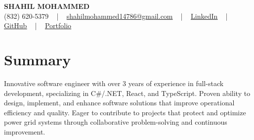 \documentclass[letterpaper,10pt]{article}
\begin{document}
\begin{center}
    {\fontsize{14pt}{12pt}\selectfont \textbf{\MakeUppercase{Shahil Mohammed}}}\\ \vspace{2pt}
    \fontsize{10pt}{12pt}\selectfont (832) 620-5379 ~ | ~ \href{mailto:shahilmohammed14786@gmail.com}{shahilmohammed14786@gmail.com} ~ | ~  
    \href{https://www.linkedin.com/in/shahil-mohammed-9652931a1/}{\color{blue}\underline{LinkedIn}}  ~ | ~ 
    \href{https://github.com/freakbeast14}{\color{blue}\underline{GitHub}} ~ | ~ 
    \href{https://shahil-mohammed.netlify.app/}{\color{blue}\underline{Portfolio}}
    \vspace{-8pt}
\end{center}

\section{Summary}
\vspace{-2pt}\fontsize{8pt}{9pt}\selectfont
Innovative software engineer with over 3 years of experience in full-stack development, specializing in C\#/.NET, React, and TypeScript. Proven ability to design, implement, and enhance software solutions that improve operational efficiency and quality. Eager to contribute to projects that protect and optimize power grid systems through collaborative problem-solving and continuous improvement.

\vspace{-5pt}
 
\vspace{-2pt}
\end{document}
